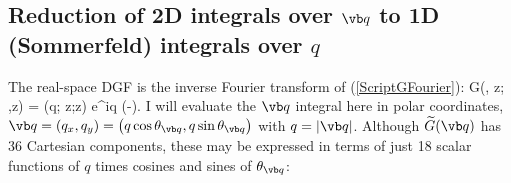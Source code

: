 \documentclass[letterpaper]{article}
\renewcommand{\wt}{\widetilde}
\begin{document}
\newpage
\subsection{Reduction of 2D integrals over $\vb q$ to 1D (Sommerfeld) integrals over $q$}
\label{gTwiddleSection}

The real-space DGF is the inverse Fourier transform of 
(\ref{ScriptGFourier}):
{
  \bmc G(\vbrho{}, z; \vbrho{},z)
= \int {}
  \wt{\bmc G}
      (\vb q; z;z) e^{i\vb q \cdot (\vbrho {}-\vbrho{})}.
}
I will evaluate the $\vb q$ integral here in polar coordinates, 
$\vb q=(q_x,q_y)=\big(q \cos\theta_{\vb q}, q\sin\theta_{\vb q}\big)$
with $q=|\vb q|$.
Although $\wt{G}(\vb q)$ has 36 Cartesian components,
these may be expressed in terms of just 18 scalar functions
of $q$ times cosines and sines of $\theta_{\vb q}$:
\end{document}
